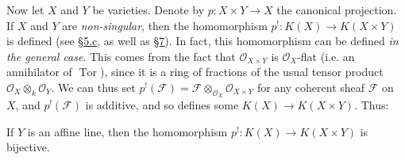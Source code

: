 \documentclass{article}
\theoremstyle{plain}
\newenvironment{proposition}[1]
    {\renewcommand\theinnerproposition{#1}\innerproposition}
    {\endinnerproposition}
\theoremstyle{definition}
\newcommand{\scr}[1]{{\mathscr{#1}}}
\DeclareMathOperator{\Tor}{Tor}
\begin{document}
Now let $X$ and $Y$ be varieties.
Denote by $p\colon X\times Y\to X$ the canonical projection.
If $X$ and $Y$ are \emph{non-singular}, then the homomorphism $p^!\colon K(X)\to K(X\times Y)$ is defined (see \hyperref[subsection5c]{\S5.c}, as well as \hyperref[section7]{\S7}).
In fact, this homomorphism can be defined \emph{in the general case}.
This comes from the fact that $\scr{O}_{X\times Y}$ is $\scr{O}_X$-flat (i.e. an annihilator of $\Tor$), since it is a ring of fractions of the usual tensor product $\scr{O}_X\otimes_k\scr{O}_Y$.
We can thus set $p^!(\scr{F})=\scr{F}\otimes_{\scr{O}_X}\scr{O}_{X\times Y}$ for any coherent sheaf $\scr{F}$ on $X$, and $p^!(\scr{F})$ is additive, and so defines some $K(X)\to K(X\times Y)$.
Thus:

\begin{proposition}{8}
\label{proposition8}
  If $Y$ is an affine line, then the homomorphism $p^!\colon K(X)\to K(X\times Y)$ is bijective.
\end{proposition}
\end{document}
